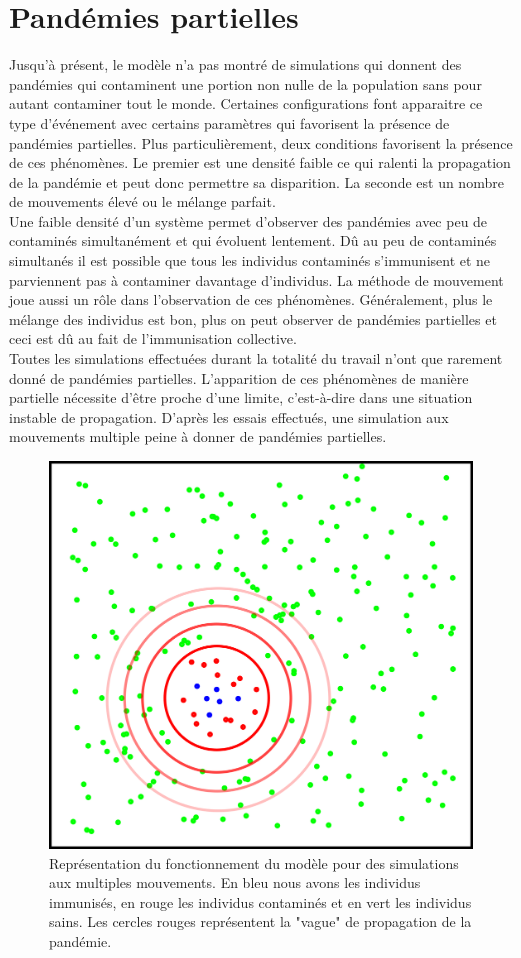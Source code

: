 \section{Pandémies partielles}

Jusqu'à présent, le modèle n'a pas montré de simulations qui donnent des pandémies qui contaminent une portion non nulle de la population sans pour autant contaminer tout le monde. Certaines configurations font apparaitre ce type d'événement avec certains paramètres qui favorisent la présence de pandémies partielles. Plus particulièrement, deux conditions favorisent la présence de ces phénomènes. Le premier est une densité faible ce qui ralenti la propagation de la pandémie et peut donc permettre sa disparition. La seconde est un nombre de mouvements élevé ou le mélange parfait.\\

Une faible densité d'un système permet d'observer des pandémies avec peu de contaminés simultanément et qui évoluent lentement. Dû au peu de contaminés simultanés il est possible que tous les individus contaminés s'immunisent et ne parviennent pas à contaminer davantage d'individus. La méthode de mouvement joue aussi un rôle dans l'observation de ces phénomènes. Généralement, plus le mélange des individus est bon, plus on peut observer de pandémies partielles et ceci est dû au fait de l'immunisation collective.\\

Toutes les simulations effectuées durant la totalité du travail n’ont que rarement donné de pandémies partielles. L’apparition de ces phénomènes de manière partielle nécessite d’être proche d’une limite, c’est-à-dire dans une situation instable de propagation. D’après les essais effectués, une simulation aux mouvements multiple peine à donner de pandémies partielles. 

\begin{figure}[h]
	\centering
	\captionsetup{justification=centering}
	\includegraphics[width=.5\textwidth]{Images/vague_propagation.png}
	\caption[Vague de propagation]{Représentation du fonctionnement du modèle pour des simulations aux multiples mouvements. En bleu nous avons les individus immunisés, en rouge les individus contaminés et en vert les individus sains. Les cercles rouges représentent la "vague" de propagation de la pandémie.}
\end{figure} 

